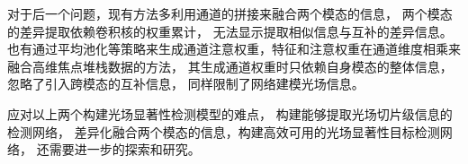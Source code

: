 对于后一个问题，现有方法多利用通道的拼接来融合两个模态的信息，
两个模态的差异提取依赖卷积核的权重累计，
无法显示提取相似信息与互补的差异信息。
也有通过平均池化等策略来生成通道注意权重，特征和注意权重在通道维度相乘来融合高维焦点堆栈数据的方法，
其生成通道权重时只依赖自身模态的整体信息，忽略了引入跨模态的互补信息，
同样限制了网络建模光场信息。










应对以上两个构建光场显著性检测模型的难点，
构建能够提取光场切片级信息的检测网络，
差异化融合两个模态的信息，构建高效可用的光场显著性目标检测网络，
还需要进一步的探索和研究。


%




%
%



